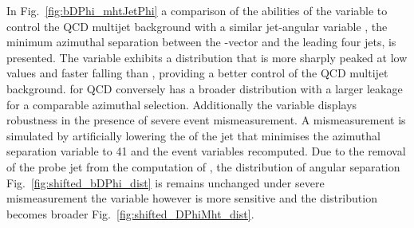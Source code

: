 In Fig.~\ref{fig:bDPhi_mhtJetPhi} a comparison of the abilities of the \bdphi variable to 
control the QCD multijet background with 
a similar jet-\mht angular variable \dphimhtj, the minimum azimuthal separation between the \mht-vector and the leading four
jets, is presented. The \bdphi variable exhibits a distribution that is more sharply peaked 
at low values and faster falling than \dphimhtj, providing a better control
of the QCD multijet background. \dphimhtj for QCD conversely has a broader 
distribution with a larger leakage for a comparable azimuthal selection. 
Additionally the \bdphi variable displays robustness in the 
presence of severe event mismeasurement. A mismeasurement is simulated by artificially lowering 
the \pt of the jet that minimises the azimuthal separation variable to 41 \GeV and the event 
variables recomputed. Due to the removal of the probe jet from the computation of \bdphi, the 
distribution of angular separation Fig.~\ref{fig:shifted_bDPhi_dist} is 
remains unchanged under severe mismeasurement the \dphimhtj variable however is more sensitive and 
the distribution becomes broader Fig.~\ref{fig:shifted_DPhiMht_dist}.


